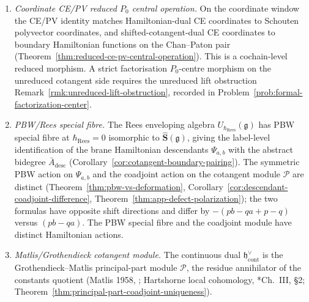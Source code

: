 \documentclass[11pt]{memoir}
\begin{document}
\begin{enumerate}[wide=0pt,leftmargin=*]
    (Lemma~\ref{lem:continuous-bar-cobar},
    Proposition~\ref{prop:ce-koszul}).
	    The lower-central Tate-pronilpotence hypothesis is an additional condition
    on the strict full polydisk.  Weighted completion gives the
    topology and Casimir convergence; lower-central pronilpotence
    requires nilpotent truncation or a relative reductive replacement
    for the \(H_2\cong\lie{sl}_2\) sector.  The strict
    Beilinson--Feigin--Mazur \cite{beilinson-feigin-mazur} product
    pair carries the same obstruction.
  \item \emph{Coordinate CE/PV reduced \(P_0\) central operation.}
    On the coordinate window the CE/PV identity matches
    Hamiltonian-dual CE coordinates to Schouten polyvector
    coordinates, and shifted-cotangent-dual CE coordinates to
    boundary Hamiltonian functions on the Chan--Paton pair
    (Theorem~\ref{thm:reduced-ce-pv-central-operation}).
    This is a cochain-level reduced morphism.  A strict
    factorisation \(P_0\)-centre morphism on the unreduced cotangent
    side requires the unreduced lift obstruction
    Remark~\ref{rmk:unreduced-lift-obstruction}, recorded in
    Problem~\ref{prob:formal-factorization-center}.
  \item \emph{PBW/Rees special fibre.}  The Rees enveloping
    algebra \(U_{\hbar_{\mathrm{Rees}}}(\mathfrak g)\) has PBW special
    fibre at \(\hbar_{\mathrm{Rees}}=0\) isomorphic to
    \(\widehat{\mathbf S}(\mathfrak g)\),
    giving the label-level identification of the brane Hamiltonian
    descendants \(\Psi_{a,b}\) with the abstract bidegree
    \(\bar A_{\mathrm{desc}}\)
    (Corollary~\ref{cor:cotangent-boundary-pairing}).
    The symmetric PBW action on \(\Psi_{a,b}\) and the coadjoint
    action on the cotangent module \(\mathcal P\) are distinct
    (Theorem~\ref{thm:pbw-vs-deformation},
    Corollary~\ref{cor:descendant-coadjoint-difference},
    Theorem~\ref{thm:app-defect-polarization}); the two formulas have
    opposite shift directions and differ by \(-(pb-qa+p-q)\) versus
    \((pb-qa)\).  The PBW special fibre and the coadjoint module have
    distinct Hamiltonian actions.
  \item \emph{Matlis/Grothendieck cotangent module.}  The continuous
    dual \(\mathfrak h^\vee_{\mathrm{cont}}\) is the
    Grothendieck--Matlis principal-part module \(\mathcal P\), the
    residue annihilator of the constants quotient (Matlis 1958,
    \cite{matlis-injective}; Hartshorne local cohomology,
    \cite{hartshorne-local-cohomology}*{Ch.~III, \S2};
    Theorem~\ref{thm:principal-part-coadjoint-uniqueness}).

\end{enumerate}
\end{document}
